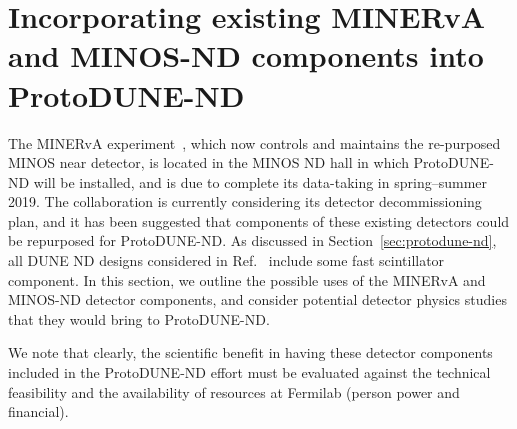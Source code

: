 \section{Incorporating existing MINERvA and MINOS-ND components into ProtoDUNE-ND}
\label{sec:MINERvA_MINOS}

The MINERvA experiment~\cite{minerva-nim}, which now controls and maintains the re-purposed MINOS near detector, is located in the MINOS ND hall in which ProtoDUNE-ND will be installed, and is due to complete its data-taking in spring--summer 2019. The collaboration is currently considering its detector decommissioning plan, and it has been suggested that components of these existing detectors could be repurposed for ProtoDUNE-ND. As discussed in Section~\ref{sec:protodune-nd}, all DUNE ND designs considered in Ref.~\cite{dune_ndcsg} include some fast scintillator component. In this section, we outline the possible uses of the MINERvA and MINOS-ND detector components, and consider potential detector physics studies that they would bring to ProtoDUNE-ND.

We note that clearly, the scientific benefit in having these detector components included in the ProtoDUNE-ND effort must be evaluated against the technical feasibility and the availability of resources at Fermilab (person power and financial). 

